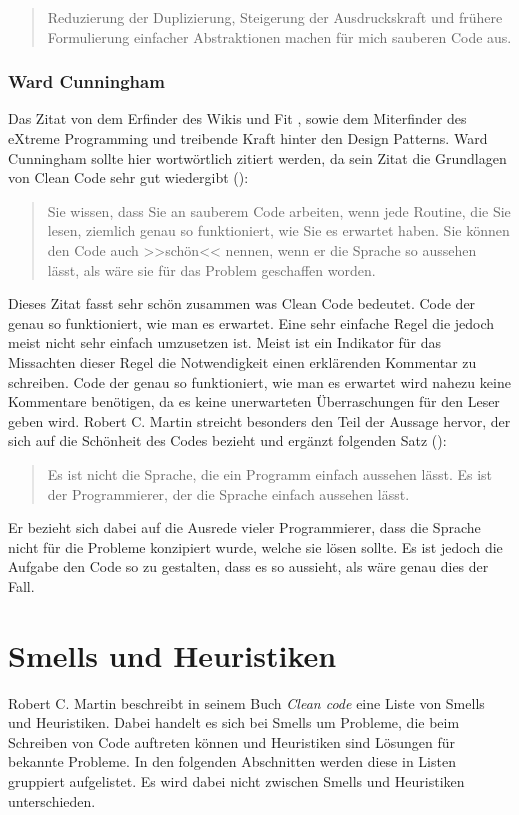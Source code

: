 \begin{quotation}
Reduzierung der Duplizierung, Steigerung der Ausdruckskraft und frühere Formulierung einfacher Abstraktionen machen für mich sauberen Code aus.
\end{quotation}

\subsubsection{Ward Cunningham}
Das Zitat von dem Erfinder des Wikis \cite{Wiki2016} und Fit \cite{Fit2016}, sowie dem Miterfinder des eXtreme Programming und treibende Kraft hinter den Design Patterns. Ward Cunningham sollte hier wortwörtlich zitiert werden, da sein Zitat die Grundlagen von Clean Code sehr gut wiedergibt (\cite[Seite 39]{Martin2008}):

\begin{quotation}
	Sie wissen, dass Sie an sauberem Code arbeiten, wenn jede Routine, die Sie lesen, ziemlich genau so funktioniert, wie Sie es erwartet haben. Sie können den Code auch >>schön<< nennen, wenn er die Sprache so aussehen lässt, als wäre sie für das Problem geschaffen worden.
\end{quotation}

Dieses Zitat fasst sehr schön zusammen was Clean Code bedeutet. Code der genau so funktioniert, wie man es erwartet. Eine sehr einfache Regel die jedoch meist nicht sehr einfach umzusetzen ist. Meist ist ein Indikator für das Missachten dieser Regel die Notwendigkeit einen erklärenden Kommentar zu schreiben. Code der genau so funktioniert, wie man es erwartet wird nahezu keine Kommentare benötigen, da es keine unerwarteten Überraschungen für den Leser geben wird. Robert C. Martin streicht besonders den Teil der Aussage hervor, der sich auf die Schönheit des Codes bezieht und ergänzt folgenden Satz  (\cite[Seite 40]{Martin2008}):

\begin{quotation}
Es ist nicht die Sprache, die ein Programm einfach aussehen lässt. Es ist der Programmierer, der die Sprache einfach aussehen lässt.
\end{quotation}

Er bezieht sich dabei auf die Ausrede vieler Programmierer, dass die Sprache nicht für die Probleme konzipiert wurde, welche sie lösen sollte. Es ist jedoch die Aufgabe den Code so zu gestalten, dass es so aussieht, als wäre genau dies der Fall.


\section{Smells und Heuristiken}
Robert C. Martin beschreibt in seinem Buch \textit{Clean code} \cite{Martin2008} eine Liste von Smells und Heuristiken. Dabei handelt es sich bei Smells um Probleme, die beim Schreiben von Code auftreten können und Heuristiken sind Lösungen für bekannte Probleme. In den folgenden Abschnitten werden diese in Listen gruppiert aufgelistet. Es wird dabei nicht zwischen Smells und Heuristiken unterschieden. 

